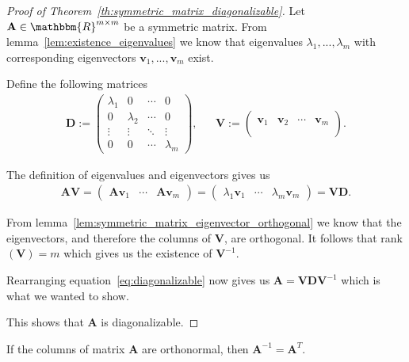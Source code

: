 \begin{proof}[Proof of Theorem~\ref{th:symmetric_matrix_diagonalizable}]
	Let $\mathbf{A} \in \mathbbm{R}^{m\times m}$ be a symmetric matrix. From lemma~\ref{lem:existence_eigenvalues} we know that eigenvalues $\lambda_1, ..., \lambda_m$ with corresponding eigenvectors $\mathbf{v}_1, ..., \mathbf{v}_m$ exist.
	
	Define the following matrices
	\begin{align*}
		\mathbf{D} := \left(\begin{matrix}
			\lambda_1 & 0 & \cdots & 0\\
			0 & \lambda_2 & \cdots & 0\\
			\vdots & \vdots & \ddots & \vdots\\
			0 & 0 & \cdots & \lambda_m
		\end{matrix}\right), &&
		\mathbf{V} := \left(\begin{matrix}
			& & &\\
			\mathbf{v}_1 & \mathbf{v}_2 & \cdots & \mathbf{v}_m\\
			& & &\\
		\end{matrix}\right).
	\end{align*}
	
	The definition of eigenvalues and eigenvectors gives us
	\begin{align}
		\label{eq:diagonalizable}
		\mathbf{AV} = \left(\begin{matrix}
			\mathbf{Av}_1 & \cdots & \mathbf{Av}_m
		\end{matrix}\right) = \left(\begin{matrix}
			\lambda_1\mathbf{v}_1 & \cdots & \lambda_m\mathbf{v}_m
		\end{matrix}\right) = \mathbf{VD}.
	\end{align}
	
	From lemma~\ref{lem:symmetric_matrix_eigenvector_orthogonal} we know that the eigenvectors, and therefore the columns of $\mathbf{V}$, are orthogonal. It follows that rank$(\mathbf{V}) = m$ which gives us the existence of $\mathbf{V}^{-1}$.
	
	Rearranging equation~\ref{eq:diagonalizable} now gives us $\mathbf{A} = \mathbf{VDV}^{-1}$ which is what we wanted to show.
	
	This shows that $\mathbf{A}$ is diagonalizable.
\end{proof}


\newpage
\begin{lemma}
	\label{lem:inverse_is_transpose}
	If the columns of matrix $\mathbf{A}$ are orthonormal, then $\mathbf{A}^{-1} = \mathbf{A}^T$.
\end{lemma}

